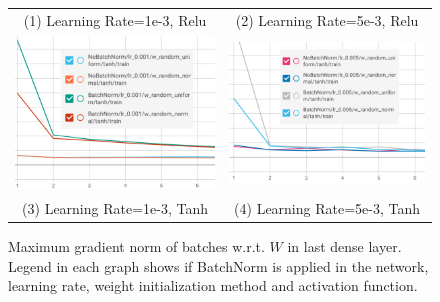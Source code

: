 \documentclass{article}
\begin{document}
\begin{figure}[!ht]
\begin{tabular}{cc}
  (1) Learning Rate=1e-3, Relu & (2) Learning Rate=5e-3, Relu\\[6pt]
  \includegraphics[scale=0.5]{pics/batchNorm/BatchNorm_tanh_1.jpg} &
  \includegraphics[scale=0.5]{pics/batchNorm/BatchNorm_tanh_5.jpg}\\
  (3) Learning Rate=1e-3, Tanh & (4) Learning Rate=5e-3, Tanh\\[6pt]
\end{tabular}
\caption{Maximum gradient norm of batches w.r.t. $W$ in last dense layer. Legend in each graph shows if BatchNorm is applied in the network, learning rate, weight initialization method and activation function.}
\label{fig:maxgradient}
\end{figure}
\end{document}
